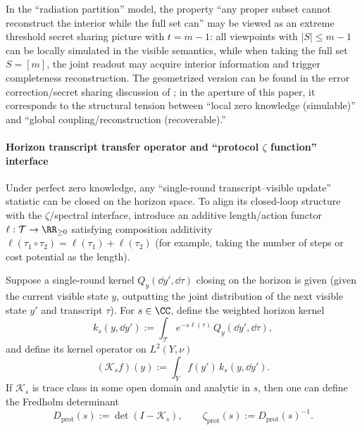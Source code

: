 \begin{remark}\label{rem:xi-threshold-zk-secret-sharing}
In the ``radiation partition'' model, the property ``any proper subset cannot reconstruct the interior while the full set can'' may be viewed as an extreme threshold secret sharing picture with \(t=m-1\): all viewpoints with \(|S|\le m-1\) can be locally simulated in the visible semantics, while when taking the full set \(S=[m]\), the joint readout may acquire interior information and trigger completeness reconstruction.
The geometrized version can be found in the error correction/secret sharing discussion of \cite{BalasubramanianEtAl2021SecretSharing}; in the aperture of this paper, it corresponds to the structural tension between ``local zero knowledge (simulable)'' and ``global coupling/reconstruction (recoverable).''
\end{remark}

\paragraph{Horizon transcript transfer operator and ``protocol \texorpdfstring{$\zeta$}{zeta} function'' interface}
Under perfect zero knowledge, any ``single-round transcript--visible update'' statistic can be closed on the horizon space.
To align its closed-loop structure with the \(\zeta\)/spectral interface, introduce an additive length/action functor \(\ell:\mathcal{T}\to\RR_{\ge 0}\) satisfying composition additivity
\(
\ell(\tau_1\circ\tau_2)=\ell(\tau_1)+\ell(\tau_2)
\)
(for example, taking the number of steps or cost potential as the length).

\begin{definition}\label{def:xi-horizon-transcript-transfer-operator}
Suppose a single-round kernel \(Q_y(\dd y',\dd\tau)\) closing on the horizon is given (given the current visible state \(y\), outputting the joint distribution of the next visible state \(y'\) and transcript \(\tau\)).
For \(s\in\CC\), define the weighted horizon kernel
\[
k_s(y,\dd y')
:=
\int_{\mathcal{T}} e^{-s\ell(\tau)}\,Q_y(\dd y',\dd\tau),
\]
and define its kernel operator on \(L^2(Y,\nu)\)
\[
(\mathcal{K}_s f)(y):=\int_Y f(y')\,k_s(y,\dd y').
\]
If \(\mathcal{K}_s\) is trace class in some open domain and analytic in \(s\), then one can define the Fredholm determinant
\[
D_{\mathrm{prot}}(s):=\det(I-\mathcal{K}_s),
\qquad
\zeta_{\mathrm{prot}}(s):=D_{\mathrm{prot}}(s)^{-1}.
\]
\end{definition}

